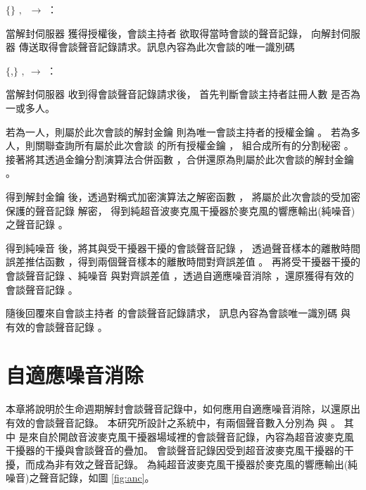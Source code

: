 \begin{pmsgs}
    \item $\{$\DEFsessionID$\}$ $,~$ \DEFowner $\rightarrow$ \DEFserver：

        當解封伺服器 \DEFserver 獲得授權後，會談主持者 \DEFowner 欲取得當時會談的聲音記錄，
    向解封伺服器 \DEFserver 傳送取得會談聲音記錄請求。訊息內容為此次會談的唯一識別碼 \DEFsessionID

    \item $\{$\DEFsessionID,\DEFrecREV$\}$ $,~$\DEFserver $\rightarrow$ \DEFowner：

        當解封伺服器 \DEFserver 收到得會談聲音記錄請求後，
    首先判斷會談主持者註冊人數 \DEFowreg 是否為一或多人。

        若為一人，則屬於此次會談的解封金鑰 \DEFunsealKey 則為唯一會談主持者的授權金鑰 \DEFagentKey。
    若為多人，則關聯查詢所有屬於此次會談 \DEFownerAll 的所有授權金鑰 \DEFagentKey，
    組合成所有的分割秘密 \DEFsharesAll。
    接著將其透過金鑰分割演算法合併函數 \DEFfuncSSC{}，合併還原為則屬於此次會談的解封金鑰 \DEFunsealKey。

        得到解封金鑰 \DEFunsealKey 後，透過對稱式加密演算法之解密函數 \DEFfuncDecEK{}，
    將屬於此次會談的受加密保護的聲音記錄 \DEFrecP 解密，
    得到純超音波麥克風干擾器於麥克風的響應輸出(純噪音)之聲音記錄 \DEFrecN。

        得到純噪音 \DEFrecN 後，將其與受干擾器干擾的會談聲音記錄 \DEFrecJ，
    透過聲音樣本的離散時間誤差推估函數 \DEFfuncEstm{}，得到兩個聲音樣本的離散時間對齊誤差值 \DEFshift。
    再將受干擾器干擾的會談聲音記錄 \DEFrecJ、純噪音 \DEFrecN
    與對齊誤差值 \DEFshift，透過自適應噪音消除 \DEFfuncAnc{}，還原獲得有效的會談聲音記錄 \DEFrecREV。

        隨後回覆來自會談主持者 \DEFowner 的會談聲音記錄請求，
    訊息內容為會談唯一識別碼 \DEFsessionID 與 有效的會談聲音記錄 \DEFrecREV。
\end{pmsgs}


\section{自適應噪音消除}\label{sec:anc}

    本章將說明於生命週期解封會談聲音記錄中，如何應用自適應噪音消除，以還原出有效的會談聲音記錄。
本研究所設計之系統中，有兩個聲音數入分別為 \DEFrecJ 與 \DEFrecN。
其中 \DEFrecJ 是來自於開啟音波麥克風干擾器場域裡的會談聲音記錄，內容為超音波麥克風干擾器的干擾與會談聲音的疊加。
會談聲音記錄因受到超音波麥克風干擾器的干擾，而成為非有效之聲音記錄。
\DEFrecN 為純超音波麥克風干擾器於麥克風的響應輸出(純噪音)之聲音記錄，如圖 \ref{fig:anc}。

